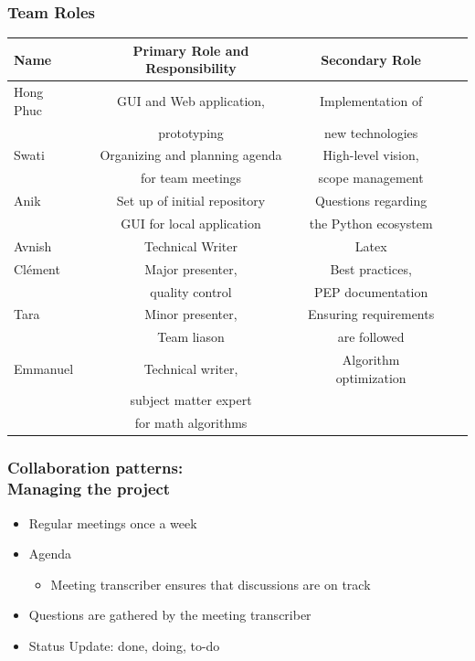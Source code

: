 \documentclass{beamer}
\begin{document}
  \begin{frame}
\frametitle{Team Roles}
\small
\begin{table}
\begin{tabular}{l | c | c | c | c }
Name & Primary Role and Responsibility & Secondary Role \\
\hline
Hong Phuc & GUI and Web application,& Implementation of\\
& prototyping & new technologies\\
\hline
Swati & Organizing and planning agenda& High-level vision, \\
& for team meetings & scope management\\
\hline
Anik & Set up of initial repository& Questions regarding\\
& GUI for local application & the Python ecosystem\\
\hline
Avnish & Technical Writer & Latex \\
\hline
Clément & Major presenter, & Best practices, \\
& quality control  & PEP documentation\\
\hline
Tara & Minor presenter, & Ensuring requirements \\
& Team liason  & are followed\\
\hline
Emmanuel & Technical writer, &  Algorithm optimization\\
& subject matter expert  & \\
& for math algorithms  & \\
\end{tabular}
\end{table}
\end{frame}

\begin{frame}
\frametitle{Collaboration patterns:\\ Managing the project}
\begin{itemize}
 \item Regular meetings once a week
 \item Agenda
   \begin{itemize}
   \item Meeting transcriber ensures that discussions are on track
   \end{itemize}
   \item Questions are gathered by the meeting transcriber
   \item Status Update: done, doing, to-do
\end{itemize}
\end{frame}
\end{document}
